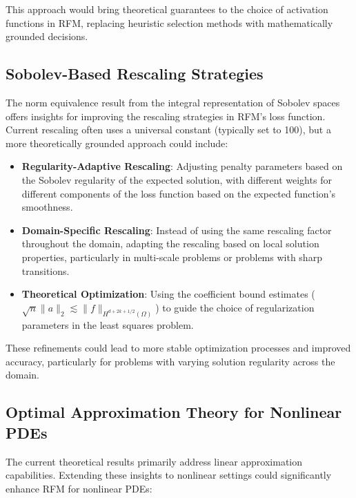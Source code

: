 \documentclass[11pt]{article}
\begin{document}
This approach would bring theoretical guarantees to the choice of activation functions in RFM, replacing heuristic selection methods with mathematically grounded decisions.

\subsection{Sobolev-Based Rescaling Strategies}

The norm equivalence result from the integral representation of Sobolev spaces offers insights for improving the rescaling strategies in RFM's loss function. Current rescaling often uses a universal constant (typically set to 100), but a more theoretically grounded approach could include:

\begin{itemize}
    \item \textbf{Regularity-Adaptive Rescaling}: Adjusting penalty parameters based on the Sobolev regularity of the expected solution, with different weights for different components of the loss function based on the expected function's smoothness.
    
    \item \textbf{Domain-Specific Rescaling}: Instead of using the same rescaling factor throughout the domain, adapting the rescaling based on local solution properties, particularly in multi-scale problems or problems with sharp transitions.
    
    \item \textbf{Theoretical Optimization}: Using the coefficient bound estimates ($\sqrt{n}\|a\|_2 \lesssim \|f\|_{H^{d+2k+1/2}(\Omega)}$) to guide the choice of regularization parameters in the least squares problem.
\end{itemize}

These refinements could lead to more stable optimization processes and improved accuracy, particularly for problems with varying solution regularity across the domain.

\subsection{Optimal Approximation Theory for Nonlinear PDEs}

The current theoretical results primarily address linear approximation capabilities. Extending these insights to nonlinear settings could significantly enhance RFM for nonlinear PDEs:
\end{document}

